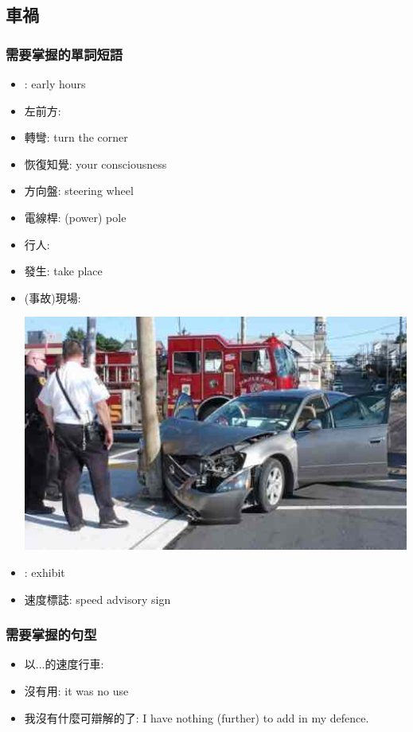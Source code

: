 \subsection{車禍}
\subsubsection*{需要掌握的單詞短語}
\begin{multicols}{2}
\begin{itemize}
  \itemsep0em
  \item {}: early hours
  \item 左前方: 
  \item 轉彎: turn the corner
  \item 恢復知覺:  your consciousness
  \item 方向盤: steering wheel
  \item 電線桿: (power) pole
  \item 行人: 
  \item 發生: take place
  \item (事故)現場: 
  \begin{center}
  	\includegraphics[scale=.45]{pics/accident-scene}
  \end{center}
  \item {}: exhibit
  \item 速度標誌: speed advisory sign
\end{itemize}
\end{multicols}

\subsubsection*{需要掌握的句型}
\begin{multicols}{2}
\begin{itemize}
  \itemsep0em
  \item 以...的速度行車: 
  \item 沒有用: it was no use
  \item 我沒有什麼可辯解的了: I have nothing (further) to add in my defence.
\end{itemize}
\end{multicols}

